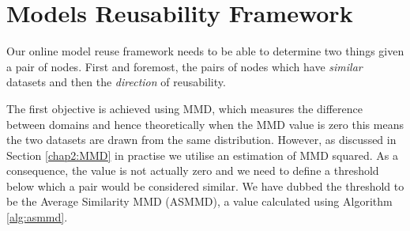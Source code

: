 \documentclass{mpaper}
\begin{document}


\section{Models Reusability Framework}
\label{chap:framework}


Our online model reuse framework needs to be able to determine two things given a pair of nodes. First and foremost, the pairs of nodes which have \textit{similar} datasets and then the \textit{direction} of reusability. 

The first objective is achieved using MMD, which measures the difference between domains and hence theoretically when the MMD value is zero this means the two datasets are drawn from the same distribution. However, as discussed in Section \ref{chap2:MMD} in practise we utilise an estimation of MMD squared. As a consequence, the value is not actually zero and we need to define a threshold below which a pair would be considered similar. We have dubbed the threshold to be the Average Similarity MMD (ASMMD), a value calculated using Algorithm \ref{alg:asmmd}. 

\SetInd{0.1em}{0.5em}
\SetNlSkip{0.3em}
\end{document}
